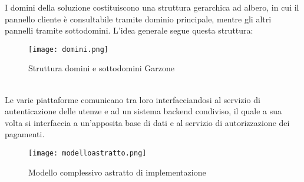 I domini della soluzione costituiscono una struttura gerarchica ad albero, in cui il pannello cliente è consultabile tramite dominio principale, mentre gli altri pannelli tramite sottodomini. L'idea generale segue questa struttura:
\begin{figure}[!htb]
    \centering
    \texttt{[image: domini.png]}
    \caption{Struttura domini e sottodomini Garzone}
\end{figure}
\\
Le varie piattaforme comunicano tra loro interfacciandosi al servizio di autenticazione delle utenze e ad un sistema backend condiviso, il quale a sua volta si interfaccia a un'apposita base di dati e al servizio di autorizzazione dei pagamenti.
\begin{figure}[!htb]
    \centering
    \texttt{[image: modelloastratto.png]}
    \caption{Modello complessivo astratto di implementazione}
\end{figure}
\\